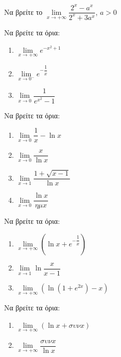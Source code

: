 \documentclass{presentation}
\begin{document}
\begin{askisi}
  Να βρείτε το $\lim\limits_{x \to +\infty}{ \dfrac{2^x-a^x}{2^x+3a^x}  }$, $a>0$
\end{askisi}

\begin{askisi}
  Να βρείτε τα όρια:
  \begin{enumerate}
    \item $\lim\limits_{x \to +\infty}{ e^{-x^2+1} }$ \pause
    \item $\lim\limits_{x \to 0^-}{ e^{-\dfrac{1}{x}} }$\pause
    \item $\lim\limits_{x \to 0}{ \dfrac{1}{e^{x^2}-1}}$
  \end{enumerate}
\end{askisi}

\begin{askisi}
  Να βρείτε τα όρια:
  \begin{enumerate}
    \item $\lim\limits_{x \to 0}{ \dfrac{1}{x}-\ln x }$ \pause
    \item $\lim\limits_{x \to 0}{ \dfrac{x}{\ln x} }$\pause
    \item $\lim\limits_{x \to 1}{ \dfrac{1+\sqrt{x-1}}{\ln x}}$\pause
    \item $\lim\limits_{x \to 0}{ \dfrac{\ln x}{ημx}}$
  \end{enumerate}
\end{askisi}

\begin{askisi}
  Να βρείτε τα όρια:
  \begin{enumerate}
    \item $\lim\limits_{x \to +\infty}{\left(    \ln x + e^{-\dfrac{1}{x}} \right)}$ \pause
    \item $\lim\limits_{x \to 1}{ \ln\dfrac{x}{x-1} }$\pause
    \item $\lim\limits_{x \to +\infty}{\left( \ln (1+e^{2x})-x \right)}$
  \end{enumerate}
\end{askisi}

\begin{askisi}
  Να βρείτε τα όρια:
  \begin{enumerate}
    \item $\lim\limits_{x \to +\infty}{\left( \ln x+συνx \right)}$ \pause
    \item $\lim\limits_{x \to +\infty}{ \dfrac{συνx}{\ln x} }$
  \end{enumerate}
\end{askisi}
\end{document}
